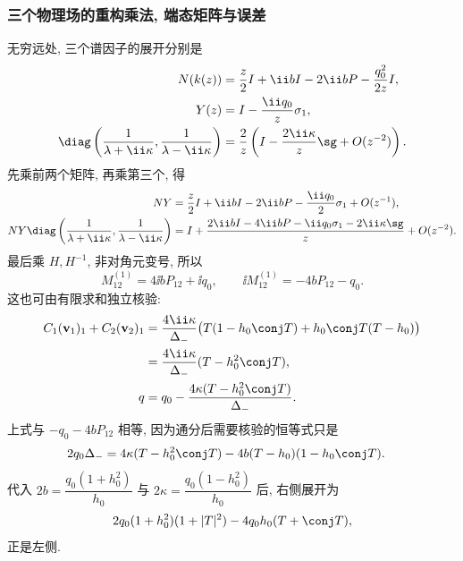 \subsubsection*{三个物理场的重构乘法, 端态矩阵与误差}
无穷远处, 三个谱因子的展开分别是
\[
\begin{aligned}
N(k(z))
&=\dfrac{z}{2}I+\ii bI-2\ii bP
-\dfrac{q_0^2}{2z}I,\\
Y(z)&=I-\dfrac{\ii q_0}{z}\sigma_1,\\
\diag\left(\dfrac{1}{\lambda+\ii\kappa},
\dfrac{1}{\lambda-\ii\kappa}\right)
&=\dfrac{2}{z}
\left(I-\dfrac{2\ii\kappa}{z}\sg+O(z^{-2})\right).
\end{aligned}
\]
先乘前两个矩阵, 再乘第三个, 得
\[
\begin{aligned}
NY
&=\dfrac{z}{2}I
+\ii bI-2\ii bP-\dfrac{\ii q_0}{2}\sigma_1
+O(z^{-1}),\\
NY\diag\left(\dfrac{1}{\lambda+\ii\kappa},
\dfrac{1}{\lambda-\ii\kappa}\right)
&=I+\dfrac{2\ii bI-4\ii bP-\ii q_0\sigma_1-2\ii\kappa\sg}{z}
+O(z^{-2}).
\end{aligned}
\]
最后乘 $H,H^{-1}$, 非对角元变号, 所以
\[
M^{(1)}_{12}=4\ii bP_{12}+\ii q_0,
\qquad
\ii M^{(1)}_{12}=-4bP_{12}-q_0.
\]
这也可由有限求和独立核验:
\[
\begin{aligned}
C_1(\mathbf v_1)_1+C_2(\mathbf v_2)_1
&=\dfrac{4\ii\kappa}{\Delta_-}
\bigl(T(1-h_0\conj T)+h_0\conj T(T-h_0)\bigr)\\
&=\dfrac{4\ii\kappa}{\Delta_-}(T-h_0^2\conj T),\\
q
&=q_0-\dfrac{4\kappa(T-h_0^2\conj T)}{\Delta_-}.
\end{aligned}
\]
上式与 $-q_0-4bP_{12}$ 相等, 因为通分后需要核验的恒等式只是
\[
\begin{aligned}
2q_0\Delta_-
={}&4\kappa(T-h_0^2\conj T)
-4b(T-h_0)(1-h_0\conj T).
\end{aligned}
\]
代入 $2b=\dfrac{q_0(1+h_0^2)}{h_0}$ 与
$2\kappa=\dfrac{q_0(1-h_0^2)}{h_0}$ 后, 右侧展开为
\[
2q_0(1+h_0^2)(1+|T|^2)-4q_0h_0(T+\conj T),
\]
正是左侧.

